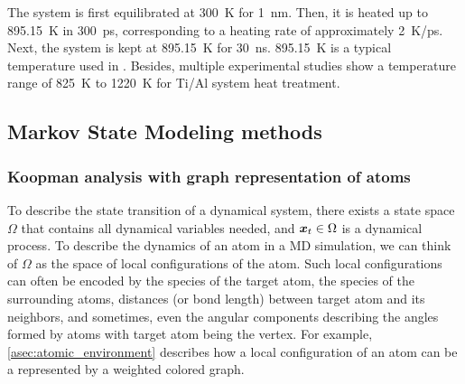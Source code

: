 The system is first equilibrated at \SI{300}{\kelvin} for \SI{1}{\nano\meter}. Then, it is heated up to \SI{895.15}{\kelvin} in \SI{300}{\pico\second}, corresponding to a heating rate of approximately \SI{2}{\kelvin/\pico\second}. Next, the system is kept at \SI{895.15}{\kelvin} for \SI{30}{\nano\second}. \SI{895.15}{\kelvin} is a typical temperature used in \cite{mirjalili2013kinetics}. Besides, multiple experimental studies show a temperature range of \SI{825}{\kelvin} to \SI{1220}{\kelvin} for Ti/Al system heat treatment.\cite{bizot2020reactivity,mirjalili2013kinetics,xu2006growth,sun2011multilayered,lazurenko2016explosively}

\subsection{Markov State Modeling methods}
\subsubsection{Koopman analysis with graph representation of atoms}
To describe the state transition of a dynamical system, there exists a state space $\Omega$ that contains all dynamical variables needed, and $\bm{x}_t \in \Omega$ is a dynamical process. To describe the dynamics of an atom in a MD simulation, we can think of $\Omega$ as the space of local configurations of the atom. Such local configurations can often be encoded by the species of the target atom, the species of the surrounding atoms, distances (or bond length) between target atom and its neighbors, and sometimes, even the angular components describing the angles formed by atoms with target atom being the vertex. For example, \cref{asec:atomic_environment} describes how a local configuration of an atom can be a represented by a weighted colored graph.



